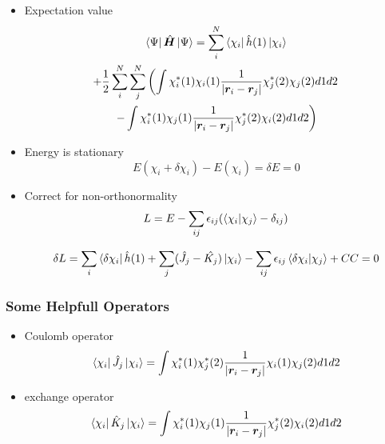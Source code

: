 \documentclass{beamer}
\begin{document}
\begin{frame}
    \begin{itemize}
        \item Expectation value
        \begin{multline*}
            \bra{\Psi}\hat{\boldsymbol{H}}\ket{\Psi} = \sum_i^N\bra{\chi_i}\hat{h}(1)\ket{\chi_i} \\
            + \frac{1}{2}\sum_i^N\sum_j^N\left(\int\chi_i^*(1)\chi_i(1)\frac{1}{|\boldsymbol{r}_i- \boldsymbol{r}_j|}\chi_j^*(2)\chi_j(2)d1d2 \right.\\
             \left. - \int\chi_i^*(1)\chi_j(1)\frac{1}{|\boldsymbol{r}_i - \boldsymbol{r}_j|}\chi_j^*(2)\chi_i(2)d1d2\right)
        \end{multline*}
    \end{itemize}
\end{frame}

\begin{frame}
    \begin{itemize}
        \item Energy is stationary
        \begin{equation*}
            E(\chi_i + \delta\chi_i) - E(\chi_i) =\delta E = 0
        \end{equation*}
        \item Correct for non-orthonormality
        \begin{equation*}
            L = E - \sum_{ij}\epsilon_{ij}(\braket{\chi_i|\chi_j} - \delta_{ij})
        \end{equation*}
        
        \begin{equation*}
            \delta L = \sum_i\bra{\delta\chi_i}\hat{h}(1) + \sum_j(\hat{J_j} - \hat{K_j})\ket{\chi_i} -  \sum_{ij}\epsilon_{ij}\braket{\delta\chi_i|\chi_j} + CC = 0
        \end{equation*}
    \end{itemize}
\end{frame}

\begin{frame}
    \frametitle{Some Helpfull Operators}
    \begin{itemize}
        \item Coulomb operator
        \begin{equation*}
            \bra{\chi_i}\hat{J}_j\ket{\chi_i} = \int\chi_i^*(1)\chi_j^*(2)\frac{1}{|\boldsymbol{r}_i- \boldsymbol{r}_j|}\chi_i(1)\chi_j(2)d1d2
         \end{equation*}
        \item exchange operator
        \begin{equation*}
            \bra{\chi_i}\hat{K}_j\ket{\chi_i} = \int\chi_i^*(1)\chi_j(1)\frac{1}{|\boldsymbol{r}_i - \boldsymbol{r}_j|}\chi_j^*(2)\chi_i(2)d1d2
        \end{equation*}
    \end{itemize}
\end{frame}
\end{document}

